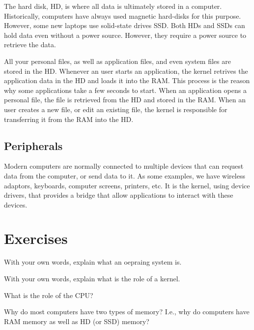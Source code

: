 The hard disk, \acs{HD}, is where all data is ultimately stored in a computer. Historically, computers have always used magnetic hard-disks for this purpose. However, some new laptops use solid-state drives \acs{SSD}. Both \acs{HD}s and \acs{SSD}s can hold data even without a power source. However, they require a power source to retrieve the data.

All your personal files, as well as application files, and even system files are stored in the \acs{HD}. Whenever an user starts an application, the kernel retrives the application data in the \acs{HD} and loads it into the \acs{RAM}. This process is the reason why some applications take a few seconds to start. When an application opens a personal file, the file is retrieved from the \acs{HD} and stored in the \acs{RAM}. When an user creates a new file, or edit an existing file, the kernel is responsible for transferring it from the \acs{RAM} into the \acs{HD}.

\subsection{Peripherals}

Modern computers are normally connected to multiple devices that can request data from the computer, or send data to it. As some examples, we have wireless adaptors, keyboards, computer screens, printers, etc. It is the kernel, using device drivers, that provides a bridge that allow applications to interact with these devices.

\section*{Exercises}


\begin{exercises}
\item With your own words, explain what an oepraing system is.
\item With your own words, explain what is the role of a kernel.
\item What is the role of the CPU?
\item Why do most computers have two types of memory? I.e., why do computers have RAM memory as well as HD (or SSD) memory?
\end{exercises}
